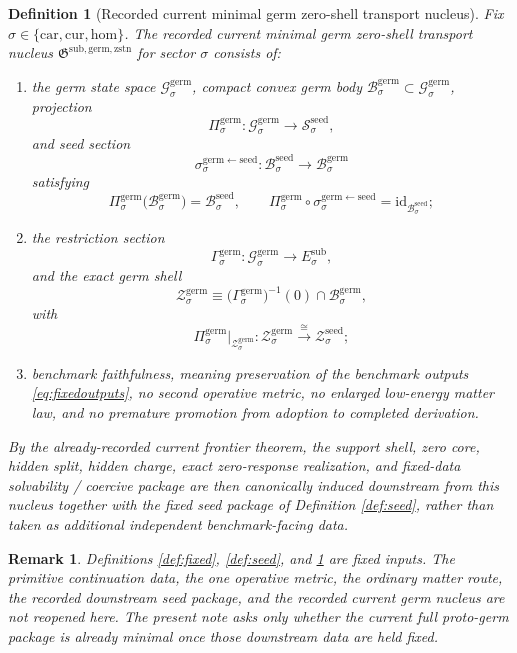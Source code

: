 \documentclass[11pt]{article}
\newcommand{\Car}{\mathrm{car}}
\newcommand{\Cur}{\mathrm{cur}}
\newcommand{\Hom}{\mathrm{hom}}
\newcommand{\SubTarget}[1]{E_{#1}^{\mathrm{sub}}}
\newcommand{\SeedState}[1]{\mathcal S_{#1}^{\mathrm{seed}}}
\newcommand{\SeedBody}[1]{\mathcal B_{#1}^{\mathrm{seed}}}
\newcommand{\SeedShell}[1]{\mathcal Z_{#1}^{\mathrm{seed}}}
\newcommand{\GermNucleus}{\mathfrak G^{\mathrm{sub,germ,zstn}}}
\newcommand{\GermState}[1]{\mathcal G_{#1}^{\mathrm{germ}}}
\newcommand{\GermBody}[1]{\mathcal B_{#1}^{\mathrm{germ}}}
\newcommand{\GermProj}[1]{\Pi_{#1}^{\mathrm{germ}}}
\newcommand{\GermSeedSec}[1]{\sigma_{#1}^{\mathrm{germ\leftarrow seed}}}
\newcommand{\GermSection}[1]{\Gamma_{#1}^{\mathrm{germ}}}
\newcommand{\GermShell}[1]{\mathcal Z_{#1}^{\mathrm{germ}}}
\newtheorem{definition}{Definition}
\newtheorem{remark}{Remark}
\begin{document}
\begin{definition}[Recorded current minimal germ zero-shell transport nucleus]
\label{def:nucleus}
Fix \(\sigma\in\{\Car,\Cur,\Hom\}\). The recorded current minimal germ zero-shell transport nucleus \(\GermNucleus\) for sector \(\sigma\) consists of:
\begin{enumerate}
    \item the germ state space \(\GermState{\sigma}\), compact convex germ body \(\GermBody{\sigma}\subset\GermState{\sigma}\), projection
    \[
    \GermProj{\sigma}:\GermState{\sigma}\to\SeedState{\sigma},
    \]
    and seed section
    \[
    \GermSeedSec{\sigma}:\SeedBody{\sigma}\to\GermBody{\sigma}
    \]
    satisfying
    \[
    \GermProj{\sigma}\bigl(\GermBody{\sigma}\bigr)=\SeedBody{\sigma},
    \qquad
    \GermProj{\sigma}\circ\GermSeedSec{\sigma}
    =
    \mathrm{id}_{\SeedBody{\sigma}};
    \]
    \item the restriction section
    \[
    \GermSection{\sigma}:\GermState{\sigma}\to\SubTarget{\sigma},
    \]
    and the exact germ shell
    \[
    \GermShell{\sigma}
    \equiv
    \bigl(\GermSection{\sigma}\bigr)^{-1}(0)\cap\GermBody{\sigma},
    \]
    with
    \[
    \GermProj{\sigma}\big|_{\GermShell{\sigma}}
    :
    \GermShell{\sigma}
    \xrightarrow{\cong}
    \SeedShell{\sigma};
    \]
    \item benchmark faithfulness, meaning preservation of the benchmark outputs \eqref{eq:fixedoutputs}, no second operative metric, no enlarged low-energy matter law, and no premature promotion from adoption to completed derivation.
\end{enumerate}
By the already-recorded current frontier theorem, the support shell, zero core, hidden split, hidden charge, exact zero-response realization, and fixed-data solvability / coercive package are then canonically induced downstream from this nucleus together with the fixed seed package of Definition \ref{def:seed}, rather than taken as additional independent benchmark-facing data.
\end{definition}

\begin{remark}
Definitions \ref{def:fixed}, \ref{def:seed}, and \ref{def:nucleus} are fixed inputs. The primitive continuation data, the one operative metric, the ordinary matter route, the recorded downstream seed package, and the recorded current germ nucleus are not reopened here. The present note asks only whether the current full proto-germ package is already minimal once those downstream data are held fixed.
\end{remark}
\end{document}
